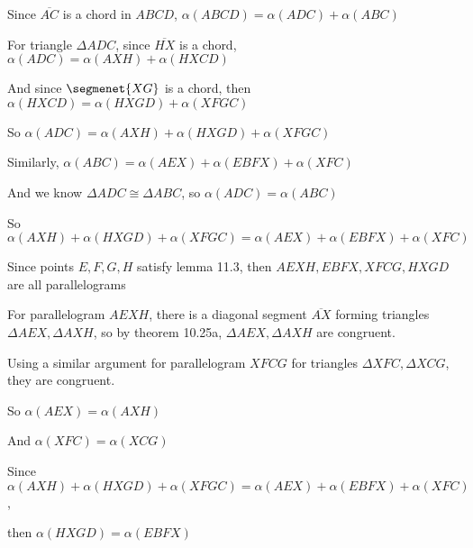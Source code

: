 \documentclass[11pt]{article}
\newcommand{\segment}[1]{\overline{#1}}
\begin{document}
\begin{itemize}
		Since $\segment{AC}$ is a chord in $ABCD$, $\alpha(ABCD) = \alpha(ADC) + \alpha(ABC)$

		For triangle $\Delta ADC$, since $\segment{HX}$ is a chord, $\alpha(ADC) = \alpha(AXH) + \alpha(HXCD)$

		And since $\segmenet{XG}$ is a chord, then $\alpha(HXCD) = \alpha(HXGD) + \alpha(XFGC)$

		So $\alpha(ADC) = \alpha(AXH) + \alpha(HXGD) + \alpha(XFGC)$

		Similarly, $\alpha(ABC) = \alpha(AEX) + \alpha(EBFX) + \alpha(XFC)$

		And we know $\Delta ADC \cong \Delta ABC$, so $\alpha(ADC) = \alpha(ABC)$

		So $\alpha(AXH) + \alpha(HXGD) + \alpha(XFGC) = \alpha(AEX) + \alpha(EBFX) + \alpha(XFC)$

		Since points $E,F,G,H$ satisfy lemma 11.3, then $AEXH, EBFX, XFCG, HXGD$ are all parallelograms

		For parallelogram $AEXH$, there is a diagonal segment $\segment{AX}$ forming triangles $\Delta AEX, \Delta AXH$, so by theorem 10.25a, $\Delta AEX, \Delta AXH$ are congruent.

		Using a similar argument for parallelogram $XFCG$ for triangles $\Delta XFC, \Delta XCG$, they are congruent.

		So $\alpha(AEX) = \alpha(AXH)$

		And $\alpha(XFC) = \alpha(XCG)$

		Since $\alpha(AXH) + \alpha(HXGD) + \alpha(XFGC) = \alpha(AEX) + \alpha(EBFX) + \alpha(XFC)$,

		then $\alpha(HXGD) = \alpha(EBFX)$
\end{itemize}
\end{document}
